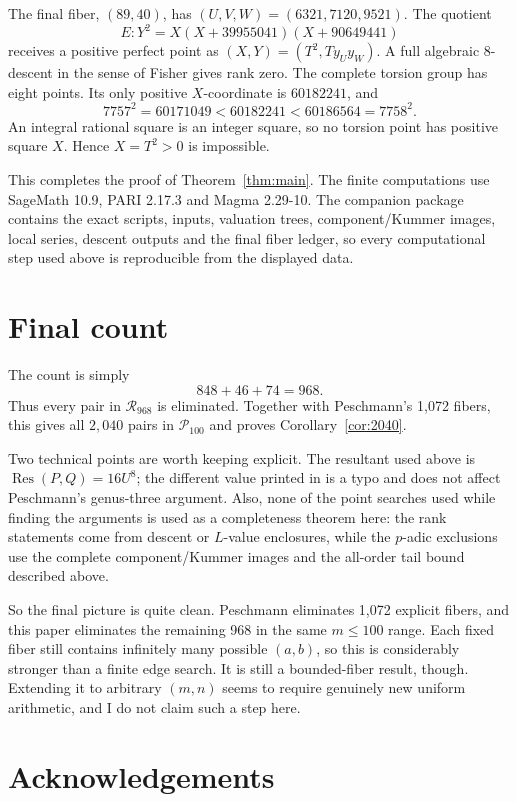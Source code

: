 \documentclass[11pt,a4paper]{amsart}
\begin{document}
The final fiber, $(89,40)$, has $(U,V,W)=(6321,7120,9521)$. The quotient
\[
E:Y^2=X(X+39955041)(X+90649441)
\]
receives a positive perfect point as $(X,Y)=(T^2,T y_Uy_W)$. A full algebraic $8$-descent in the sense of Fisher \cite{Fisher} gives rank zero. The complete torsion group has eight points. Its only positive $X$-coordinate is $60182241$, and
\[
7757^2=60171049<60182241<60186564=7758^2.
\]
An integral rational square is an integer square, so no torsion point has positive square $X$. Hence $X=T^2>0$ is impossible.

This completes the proof of Theorem~\ref{thm:main}. The finite computations use SageMath 10.9, PARI 2.17.3 and Magma 2.29-10. The companion package contains the exact scripts, inputs, valuation trees, component/Kummer images, local series, descent outputs and the final fiber ledger, so every computational step used above is reproducible from the displayed data.

\section{Final count}
The count is simply
\[
848+46+74=968.
\]
Thus every pair in $\mathcal R_{968}$ is eliminated. Together with Peschmann's 1,072 fibers, this gives all $2,040$ pairs in $\mathcal P_{100}$ and proves Corollary~\ref{cor:2040}.

Two technical points are worth keeping explicit. The resultant used above is $\operatorname{Res}(P,Q)=16U^8$; the different value printed in \cite{Pes1072} is a typo and does not affect Peschmann's genus-three argument. Also, none of the point searches used while finding the arguments is used as a completeness theorem here: the rank statements come from descent or $L$-value enclosures, while the $p$-adic exclusions use the complete component/Kummer images and the all-order tail bound described above.

So the final picture is quite clean. Peschmann eliminates 1,072 explicit fibers, and this paper eliminates the remaining 968 in the same $m\le100$ range. Each fixed fiber still contains infinitely many possible $(a,b)$, so this is considerably stronger than a finite edge search. It is still a bounded-fiber result, though. Extending it to arbitrary $(m,n)$ seems to require genuinely new uniform arithmetic, and I do not claim such a step here.

\section{Acknowledgements}
\end{document}
